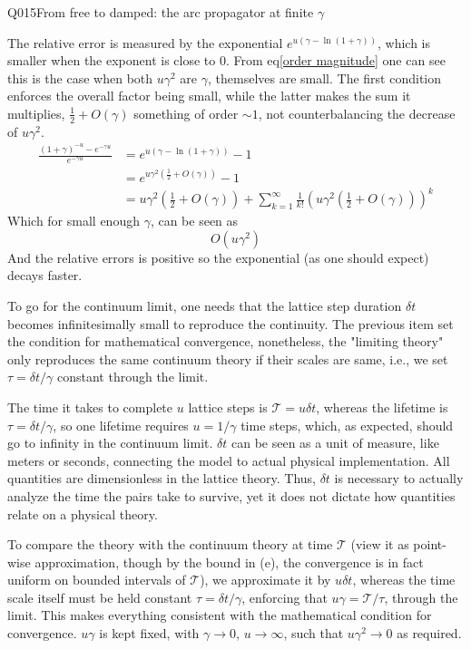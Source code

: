 \begin{entry}{Q015}{From free to damped: the arc propagator at finite $\gamma$}
\begin{solution}[e]
The relative error is measured by the exponential $e^{u(\gamma -\ln (1+\gamma))}$, which is smaller when the exponent is close to 0. From eq\eqref{order magnitude} one can see this is the case when both $u\gamma^2$ are $\gamma$, themselves are small. The first condition enforces the overall factor being small, while the latter makes the sum it multiplies, $\frac{1}{2} + O(\gamma)$ something of order $\sim 1$, not counterbalancing the decrease of $u\gamma^2$. 
\begin{equation}
\begin{split}
    \frac{(1+\gamma)^{-u}-e^{-\gamma u }}{e^{-\gamma u }} &= e^{u(\gamma -\ln (1+\gamma))} -1 \\
    &= e^{u\gamma^2\left(\frac{1}{2}+O(\gamma)\right)} -1\\
    &= u\gamma^2\left(\frac{1}{2}+O(\gamma)\right) + \sum_{k=1}^{\infty} \frac{1}{k!} \left(u\gamma^2\left(\frac{1}{2}+O(\gamma)\right)\right)^k
\end{split} 
\end{equation}
Which for small enough $\gamma$, can be seen as 
\begin{equation}
    O(u\gamma^2)
\end{equation}
And the relative errors is positive so the exponential (as one should expect) decays faster.
\end{solution}

\begin{solution}[f]
    To go for the continuum limit, one needs that the lattice step duration $\delta t$ becomes infinitesimally small to reproduce the continuity. The previous item set the condition for mathematical convergence, nonetheless, the "limiting theory" only reproduces the same continuum theory if their scales are same, i.e., we set $\tau = \delta t/\gamma$ constant through the limit. 

    The time it takes to complete $u$ lattice steps is $\mathcal T=u\delta t$, whereas the lifetime is $\tau = \delta t/\gamma$, so one lifetime requires $u= 1/\gamma$ time steps, which, as expected, should go to infinity in the continuum limit. $\delta t$ can be seen as a unit of measure, like meters or seconds, connecting the model to actual physical implementation. 
    All quantities are dimensionless in the lattice theory. Thus, $\delta t$ is necessary to actually analyze the time the pairs take to survive, yet it does not dictate how quantities relate on a physical theory.
    
    To compare the theory with the continuum theory at time $\mathcal T$ (view it as point-wise approximation, though by the bound in (e), the convergence is in fact uniform on bounded intervals of $\mathcal{T}$), we approximate it by $u \delta t$, whereas the time scale itself must be held constant $\tau = \delta t/\gamma$, enforcing that $u\gamma = \mathcal T/ \tau$, through the limit. This makes everything consistent with the mathematical condition for convergence. $u \gamma$ is kept fixed, with $\gamma \rightarrow 0$, $u\rightarrow \infty$, such that $u\gamma^2 \rightarrow 0$ as required. 
\end{solution}



\end{entry}
